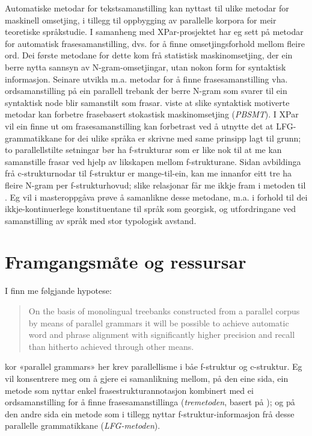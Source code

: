 \documentclass[11pt,a4paper,oneside,draft]{book}
\begin{document}
Automatiske metodar for tekstsamanstilling kan nyttast til ulike
metodar for maskinell omsetjing, i tillegg til oppbygging av
parallelle korpora for meir teoretiske språkstudie. I samanheng med
XPar-prosjektet \citep{xpar2008rcn} har eg sett på metodar for
automatisk frasesamanstilling, dvs. for å finne omsetjingsforhold
mellom fleire ord. Dei første metodane for dette kom frå statistisk
maskinomsetjing, der ein berre nytta sannsyn av N-gram-omsetjingar,
utan nokon form for syntaktisk informasjon. Seinare utvikla m.a.
\citet{samuelsson2007apa} metodar for å finne
frasesamanstilling vha. ordsamanstilling på ein parallell trebank der
berre N-gram som svarer til ein syntaktisk node blir samanstilt som
frasar. \citet{tinsley2007ept, hearne2008ccd} viste at slike
syntaktisk motiverte metodar kan forbetre frasebasert stokastisk
maskinomsetjing (\emph{PBSMT}). I XPar vil ein finne ut om
frasesamanstilling kan forbetrast ved å utnytte det at
LFG-grammatikkane for dei ulike språka er skrivne med same prinsipp
lagt til grunn; to parallellstilte setningar bør ha f-strukturar som
er like nok til at me kan samanstille frasar ved hjelp av likskapen
mellom f-strukturane. Sidan avbildinga frå c-strukturnodar til
f-struktur er mange-til-ein, kan me innanfor eitt tre ha fleire N-gram
per f-strukturhovud; slike relasjonar får me ikkje fram i metoden til
\citet{samuelsson2007apa}. Eg vil i masteroppgåva prøve å samanlikne
desse metodane, m.a. i forhold til dei ikkje-kontinuerlege
konstituentane til språk som georgisk, og utfordringane ved
samanstilling av språk med stor typologisk avstand.

\section{Framgangsmåte og ressursar}
\label{sec-1.1}

I \citet[s.~5--6]{xpar2008rcn} finn me følgjande hypotese:

\begin{quote}
On the basis of monolingual treebanks constructed from a parallel
corpus by means of parallel grammars it will be possible to achieve
automatic word and phrase alignment with significantly higher
precision and recall than hitherto achieved through other means.
\end{quote}

kor «parallel grammars» her krev parallellisme i båe f-struktur og
c-struktur. Eg vil konsentrere meg om å gjere ei samanlikning mellom,
på den eine sida, ein metode som nyttar enkel frasestrukturannotasjon
kombinert med ei ordsamanstilling for å finne frasesamanstillinga
(\emph{tremetoden}, basert på \citet{samuelsson2007apa}); og på den andre
sida ein metode som i tillegg nyttar f-struktur-informasjon frå desse
parallelle grammatikkane (\emph{LFG-metoden}).
\end{document}
